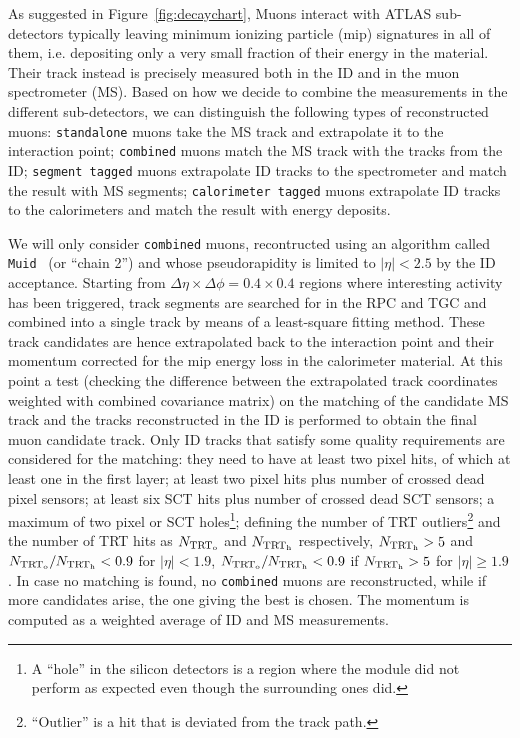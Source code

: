 As suggested in Figure~\ref{fig:decaychart}, 
Muons interact with ATLAS sub-detectors typically 
leaving minimum ionizing particle (mip) signatures in
all of them, i.e. depositing
only a very small fraction of their energy in the material. 
Their track instead is precisely
measured both in the ID and in the muon spectrometer (MS). 
Based on how we decide to combine
the measurements in the different sub-detectors, we can 
distinguish the following types of reconstructed muons:
\texttt{standalone} muons take the MS track and extrapolate it to the interaction point;
\texttt{combined} muons match the MS track with the tracks from the ID;
\texttt{segment tagged} muons extrapolate ID tracks to the spectrometer and match the result with MS segments;
\texttt{calorimeter tagged} muons extrapolate ID tracks to the calorimeters and match the result with
energy deposits. 

We will only consider \texttt{combined} muons, recontructed using an algorithm 
called \texttt{Muid}~\cite{ATLAS-CONF-2011-063} (or ``chain 2'')
and whose pseudorapidity is limited to $|\eta|<2.5$ by the ID acceptance.
Starting from $\Delta\eta\times\Delta\phi=0.4\times0.4$ regions where interesting activity has been triggered,
track segments are searched for in the RPC and TGC and combined into a single track by means of a
least-square fitting method. These track candidates are hence extrapolated back to the interaction
point and their momentum corrected for the mip energy loss in the calorimeter material.
At this point a \chisq test (checking the difference between the extrapolated track coordinates weighted with
combined covariance matrix) on the matching of the candidate MS track and the tracks reconstructed in 
the ID is performed to obtain the final muon candidate track. Only ID tracks that satisfy some quality 
requirements are considered for the matching: they need to have at least two pixel hits, of which at least
one in the first layer; at least two pixel hits plus number of crossed dead pixel sensors; at least six SCT hits
plus number of  crossed dead SCT sensors; a maximum of two pixel or SCT holes\footnote{A ``hole'' in the silicon
detectors is a region where the module did not perform as expected even though the surrounding ones did.};
defining the number of TRT outliers\footnote{``Outlier'' is a hit that is deviated from the track path.} 
and the number of TRT hits as $N_{\rm TRT_{o}}$ and  $N_{\rm TRT_{h}}$ respectively, 
$N_{\rm TRT_{h}}>5$ and $N_{\rm TRT_{o}}/N_{\rm TRT_{h}}<0.9$ for $|\eta|<1.9$, 
$N_{\rm TRT_{o}}/N_{\rm TRT_{h}}<0.9$ if $N_{\rm TRT_{h}}>5$ for  $|\eta|\geq1.9$.
In case no matching is found, no \texttt{combined} 
muons are reconstructed, while if more candidates arise, the one giving the best \chisq is chosen.
The momentum is computed as a weighted average of ID and MS measurements.

